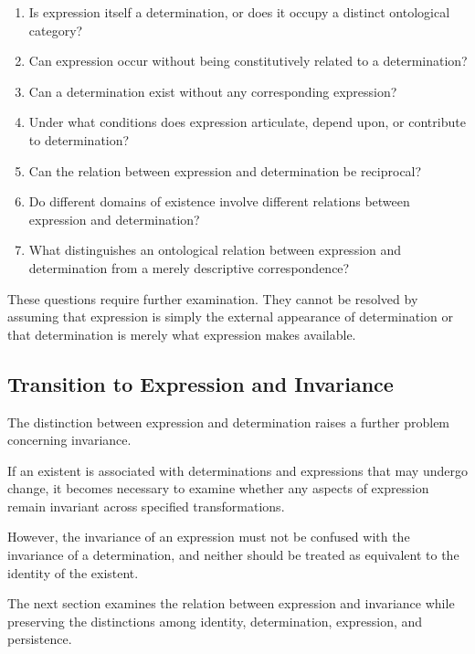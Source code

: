 \begin{enumerate}
    \item Is expression itself a determination,
    or does it occupy a distinct ontological category?

    \item Can expression occur without being
    constitutively related to a determination?

    \item Can a determination exist without any
    corresponding expression?

    \item Under what conditions does expression
    articulate, depend upon, or contribute to
    determination?

    \item Can the relation between expression
    and determination be reciprocal?

    \item Do different domains of existence involve
    different relations between expression
    and determination?

    \item What distinguishes an ontological relation
    between expression and determination from
    a merely descriptive correspondence?
\end{enumerate}

These questions require further examination.
They cannot be resolved by assuming that expression
is simply the external appearance of determination
or that determination is merely what expression
makes available.

\subsection{Transition to Expression and Invariance}

The distinction between expression and determination
raises a further problem concerning invariance.

If an existent is associated with determinations
and expressions that may undergo change, it becomes
necessary to examine whether any aspects of expression
remain invariant across specified transformations.

However, the invariance of an expression must not
be confused with the invariance of a determination,
and neither should be treated as equivalent to
the identity of the existent.

The next section examines the relation between
expression and invariance while preserving the
distinctions among identity, determination,
expression, and persistence.

